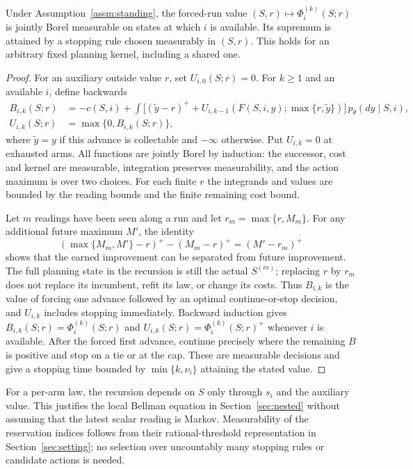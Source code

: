 \begin{lemma}\label{lem:run-dp}
Under Assumption~\ref{assm:standing}, the forced-run value
$(S,r)\mapsto\Phi_i^{(k)}(S;r)$ is jointly Borel measurable on states at which $i$ is
available. Its supremum is attained by a stopping rule chosen measurably in $(S,r)$.
This holds for an arbitrary fixed planning kernel, including a shared one.
\end{lemma}
\begin{proof}
For an auxiliary outside value $r$, set $U_{i,0}(S;r)=0$. For $k\ge1$ and an available $i$,
define backwards
\begin{align*}
B_{i,k}(S;r)&=-c(S,i)+\int\bigl[(\tilde y-r)^+
 +U_{i,k-1}(F(S,i,y);\max\{r,\tilde y\})\bigr]\,p_\theta(dy\mid S,i),\\
U_{i,k}(S;r)&=\max\{0,B_{i,k}(S;r)\},
\end{align*}
where $\tilde y=y$ if this advance is collectable and $-\infty$ otherwise. Put $U_{i,k}=0$
at exhausted arms. All functions are jointly Borel by induction: the successor, cost and kernel
are measurable, integration preserves measurability, and the action maximum is over two
choices. For each finite $r$ the integrands and values are bounded by the reading bounds and
the finite remaining cost bound.

Let $m$ readings have been seen along a run and let $r_m=\max\{r,M_m\}$. For any additional
future maximum $M'$, the identity
\[
(\max\{M_m,M'\}-r)^+-(M_m-r)^+=(M'-r_m)^+
\]
shows that the earned improvement can be separated from future improvement. The full planning
state in the recursion is still the actual $S^{(m)}$; replacing $r$ by $r_m$ does not replace
its incumbent, refit its law, or change its costs. Thus $B_{i,k}$ is the value of forcing one
advance followed by an optimal continue-or-stop decision, and $U_{i,k}$ includes stopping
immediately. Backward induction gives
$B_{i,k}(S;r)=\Phi_i^{(k)}(S;r)$ and $U_{i,k}(S;r)=\Phi_i^{(k)}(S;r)^+$ whenever $i$ is
available. After the forced first advance, continue precisely where the remaining $B$ is
positive and stop on a tie or at the cap. These are measurable decisions and give a stopping
time bounded by $\min\{k,\nu_i\}$ attaining the stated value.
\end{proof}

For a per-arm law, the recursion depends on $S$ only through $s_i$ and the auxiliary value.
This justifies the local Bellman equation in Section~\ref{sec:nested} without assuming that
the latest scalar reading is Markov. Measurability of the reservation indices follows from
their rational-threshold representation in Section~\ref{sec:setting}; no selection over
uncountably many stopping rules or candidate actions is needed.

